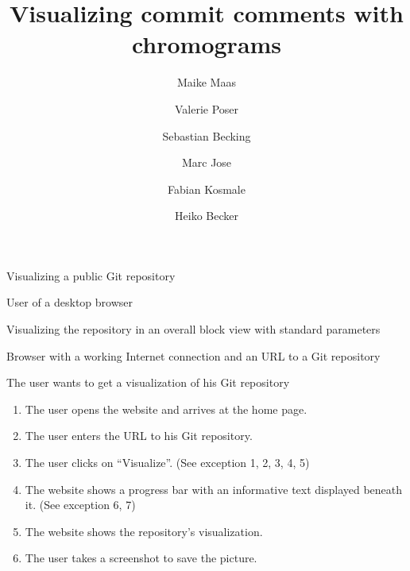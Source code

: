 \documentclass[11pt]{scrartcl}
\author{Maike Maas \and Valerie Poser \and Sebastian Becking \and
        Marc Jose \and Fabian Kosmale \and Heiko Becker}
\title{Visualizing commit comments with chromograms}
\begin{document}
\maketitle

\begin{description}[leftmargin=!,labelwidth=\widthof{\bfseries Frequency of use:}]
	\item[Use-case:] Visualizing a public Git repository 
	\item[Primary actor:] User of a desktop browser 
	\item[Goal in context:] Visualizing the repository in an overall block view with standard parameters 
	\item[Preconditions:] Browser with a working Internet connection and an URL to a Git repository
	\item[Trigger:] The user wants to get a visualization of his Git repository 

	\item[Scenario:]
		\begin{enumerate}[leftmargin=1.5em]
			\item The user opens the website and arrives at the home page.
			\item The user enters the URL to his Git repository. 
			\item The user clicks on \enquote{Visualize}. (See exception 1, 2, 3, 4, 5)
			\item The website shows a progress bar with an
				informative text displayed beneath
				it. (See exception 6, 7)
			\item The website shows the repository's visualization.
			\item The user takes a screenshot to save the picture. 
		\end{enumerate}
		

\end{description}
\end{document}
